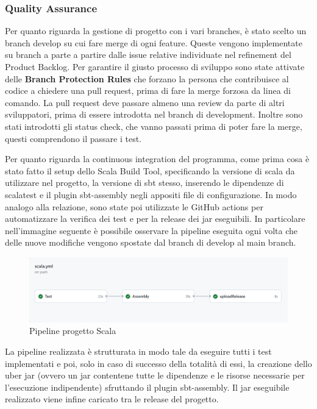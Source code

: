         \subsubsection{Quality Assurance}
        Per quanto riguarda la gestione di progetto con i vari branches, è stato scelto un branch develop su cui fare merge di ogni feature. Queste vengono implementate su branch a parte a partire dalle issue relative individuate nel refinement del Product Backlog. 
        Per garantire il giusto processo di sviluppo sono state attivate delle \textbf{Branch Protection Rules} che forzano la persona che contribuisce al codice a chiedere una pull request, prima di fare la merge forzosa da linea di comando. La pull request deve passare almeno una review da parte di altri sviluppatori, prima di essere introdotta nel branch di development. Inoltre sono stati introdotti gli status check, che vanno passati prima di poter fare la merge, questi comprendono il passare i test. 
        
    Per quanto riguarda la continuous integration del programma, come prima cosa è stato fatto il setup dello Scala Build Tool, specificando la versione di scala da utilizzare nel progetto, la versione di sbt stesso, inserendo le dipendenze di scalatest e il plugin sbt-assembly negli appositi file di configurazione. In modo analogo alla relazione, sono state poi utilizzate le GitHub actions per automatizzare la verifica dei test e per la release dei jar eseguibili. In particolare nell'immagine seguente è possibile osservare la pipeline eseguita ogni volta che delle nuove modifiche vengono spostate dal branch di develop al main branch.

    \begin{figure}[H]
        \caption{Pipeline progetto Scala}
        \label{fig:scala-ci-github}
        \centering
        \includegraphics[width=1\textwidth]{Images/scalaCI-pipeline.png}
    \end{figure}

    La pipeline realizzata è strutturata in modo tale da eseguire tutti i test implementati e poi, solo in caso di successo della totalità di essi, la creazione dello uber jar (ovvero un jar contentene tutte le dipendenze e le risorse necessarie per l'esecuzione indipendente) sfruttando il plugin sbt-assembly. Il jar eseguibile realizzato viene infine caricato tra le release del progetto.






